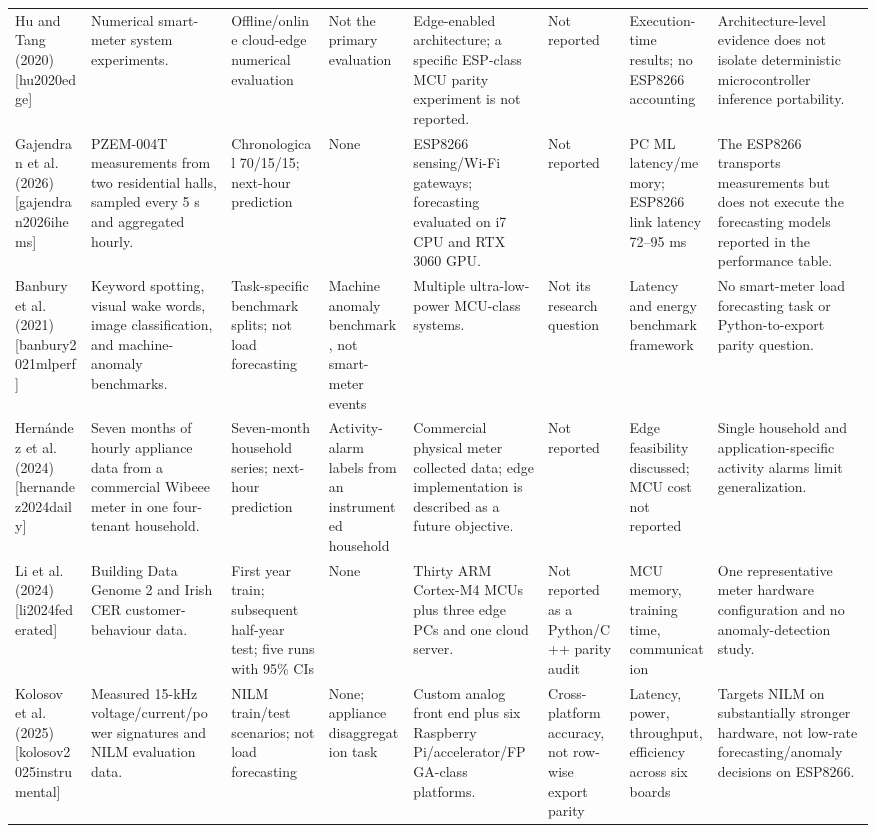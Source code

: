 \begin{table}[t]
{\begin{tabular}{llllllll}
Hu and Tang (2020) [hu2020edge] & Numerical smart-meter system experiments. & Offline/online cloud-edge numerical evaluation & Not the primary evaluation & Edge-enabled architecture; a specific ESP-class MCU parity experiment is not reported. & Not reported & Execution-time results; no ESP8266 accounting & Architecture-level evidence does not isolate deterministic microcontroller inference portability. \\
Gajendran et al. (2026) [gajendran2026ihems] & PZEM-004T measurements from two residential halls, sampled every 5 s and aggregated hourly. & Chronological 70/15/15; next-hour prediction & None & ESP8266 sensing/Wi-Fi gateways; forecasting evaluated on i7 CPU and RTX 3060 GPU. & Not reported & PC ML latency/memory; ESP8266 link latency 72--95 ms & The ESP8266 transports measurements but does not execute the forecasting models reported in the performance table. \\
Banbury et al. (2021) [banbury2021mlperf] & Keyword spotting, visual wake words, image classification, and machine-anomaly benchmarks. & Task-specific benchmark splits; not load forecasting & Machine anomaly benchmark, not smart-meter events & Multiple ultra-low-power MCU-class systems. & Not its research question & Latency and energy benchmark framework & No smart-meter load forecasting task or Python-to-export parity question. \\
Hernández et al. (2024) [hernandez2024daily] & Seven months of hourly appliance data from a commercial Wibeee meter in one four-tenant household. & Seven-month household series; next-hour prediction & Activity-alarm labels from an instrumented household & Commercial physical meter collected data; edge implementation is described as a future objective. & Not reported & Edge feasibility discussed; MCU cost not reported & Single household and application-specific activity alarms limit generalization. \\
Li et al. (2024) [li2024federated] & Building Data Genome 2 and Irish CER customer-behaviour data. & First year train; subsequent half-year test; five runs with 95\% CIs & None & Thirty ARM Cortex-M4 MCUs plus three edge PCs and one cloud server. & Not reported as a Python/C++ parity audit & MCU memory, training time, communication & One representative meter hardware configuration and no anomaly-detection study. \\
Kolosov et al. (2025) [kolosov2025instrumental] & Measured 15-kHz voltage/current/power signatures and NILM evaluation data. & NILM train/test scenarios; not load forecasting & None; appliance disaggregation task & Custom analog front end plus six Raspberry Pi/accelerator/FPGA-class platforms. & Cross-platform accuracy, not row-wise export parity & Latency, power, throughput, efficiency across six boards & Targets NILM on substantially stronger hardware, not low-rate forecasting/anomaly decisions on ESP8266. \\

\end{tabular}}
\end{table}

